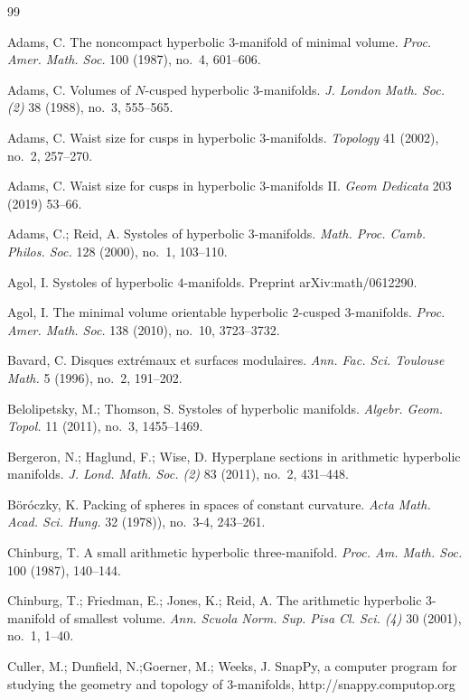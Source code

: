 \documentclass[11pt,reqno]{amsart}
\theoremstyle{definition}
\numberwithin{equation}{section}
\numberwithin{equation}{section}
\begin{document}
\begin{thebibliography}{99}

Adams, C. 
The noncompact hyperbolic $3$-manifold of minimal volume.
\emph{Proc. Amer. Math. Soc.} 100 (1987), no.~4, 601--606.

Adams, C. 
Volumes of $N$-cusped hyperbolic $3$-manifolds.
\emph{J. London Math. Soc. (2)} 38 (1988), no.~3, 555--565.

Adams, C.
Waist size for cusps in hyperbolic $3$-manifolds.
\emph{Topology} 41 (2002), no.~2, 257--270.

Adams, C. 
Waist size for cusps in hyperbolic $3$-manifolds II. 
\emph{Geom Dedicata} 203 (2019) 53--66.

Adams, C.; Reid, A.
Systoles of hyperbolic $3$-manifolds. 
\emph{Math. Proc. Camb. Philos. Soc.} 128 (2000), no.~1, 103--110.

Agol, I.
Systoles of hyperbolic $4$-manifolds.
Preprint arXiv:math/0612290.

Agol, I.
The minimal volume orientable hyperbolic $2$-cusped $3$-manifolds.
\emph{Proc. Amer. Math. Soc.} 138 (2010), no.~10, 3723--3732.

Bavard, C.
Disques extr\'emaux et surfaces modulaires.
\emph{Ann. Fac. Sci. Toulouse Math.} 5 (1996), no.~2, 191--202.

Belolipetsky, M.; Thomson, S.
Systoles of hyperbolic manifolds.
\emph{Algebr. Geom. Topol.} 11 (2011), no.~3, 1455--1469.

Bergeron, N.; Haglund, F.; Wise, D.
Hyperplane sections in arithmetic hyperbolic manifolds.
\emph{J. Lond. Math. Soc. (2)} 83 (2011), no.~2, 431--448.

B\"or\'oczky, K.
Packing of spheres in spaces of constant curvature.
\emph{Acta Math. Acad. Sci. Hung.} 32 (1978)), no.~3-4, 243--261.

Chinburg, T.
A small arithmetic hyperbolic three-manifold.
\emph{Proc. Am. Math. Soc.} 100 (1987), 140--144. 

Chinburg, T.; Friedman, E.; Jones, K.; Reid, A.
The arithmetic hyperbolic 3-manifold of smallest volume.
\emph{Ann. Scuola Norm. Sup. Pisa Cl. Sci. (4)} 30 (2001), no.~1, 1--40.

Culler, M.; Dunfield, N.;Goerner, M.; Weeks, J.
SnapPy, a computer program for studying the geometry and topology of $3$-manifolds, http://snappy.computop.org


\end{thebibliography}
\end{document}
